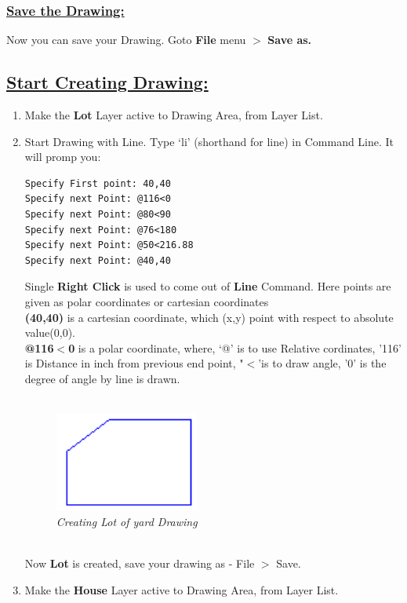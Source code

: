 \subsubsection*{\underline{Save the Drawing:}}
Now you can save your Drawing. Goto \textbf{File} menu $>$ \textbf{Save as.}
%
\newpage
\vspace{3mm}
\subsection*{\underline{Start Creating Drawing:}}\vspace{.5in}
\begin{enumerate}
\item{Make the \textbf{Lot} Layer active to Drawing Area, from Layer List.}
\item{Start Drawing with Line. Type `li' (shorthand for line) in Command Line. It will promp you:
\begin{verbatim}
Specify First point: 40,40
Specify next Point: @116<0
Specify next Point: @80<90
Specify next Point: @76<180
Specify next Point: @50<216.88
Specify next Point: @40,40
\end{verbatim}
Single \textbf{Right Click} is used to come out of \textbf{Line} Command. 
Here points are given as polar coordinates or cartesian coordinates\\
\textbf{(40,40)} is a cartesian coordinate, which (x,y) point with respect to absolute value(0,0).\\
\textbf{@116$<$0} is a polar coordinate, where, `@' is to use Relative cordinates, '116' is Distance in inch from previous end point, "$<$'is to draw angle, '0' is the degree of angle by line is drawn.\\\\
\begin{figure}[h!]
       \centering\includegraphics[width=180px]{./images-yard/lot.png}
       \caption{\small \sl Creating Lot of yard Drawing}
       \end{figure}
\\Now \textbf{Lot} is created, save your drawing as -  File $>$ Save.}
%
\item{Make the \textbf{House} Layer active to Drawing Area, from Layer List.}

\end{enumerate}
